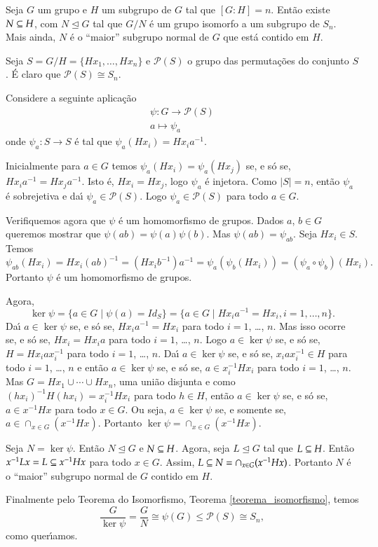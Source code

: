 \begin{teorema}\label{teorema_da_representacao}
	Seja $G$ um grupo e $H$ um subgrupo de $G$ tal que $[G : H] = n$. Ent\~ao existe $N \subseteq H$, com $N \unlhd G$ tal que $G/N$ \'e um grupo isomorfo a um subgrupo de $S_n$. Mais ainda, $N$ \'e o ``maior'' subgrupo normal de $G$ que est\'a contido em $H$.
\end{teorema}
\begin{prova}
	Seja $S = G/H = \{Hx_1, \dots, Hx_n\}$ e $\mathcal{P}(S)$ o grupo das permuta\c{c}\~oes do conjunto $S$. \'E claro que $\mathcal{P}(S) \cong S_n$.

	Considere a seguinte aplica\c{c}\~ao
	\begin{align*}
		\psi : G \to \mathcal{P}(S)\\
		a \mapsto \psi_a
	\end{align*}
	onde $\psi_a : S \to S$ \'e tal que $\psi_a(Hx_i) = Hx_ia^{-1}$.

	Inicialmente para $a \in G$ temos $\psi_a(Hx_i) = \psi_a(Hx_j)$ se, e s\'o se, $Hx_ia^{-1} = Hx_ja^{-1}$. Isto \'e, $Hx_i = Hx_j$, logo $\psi_a$ \'e injetora. Como $|S| = n$, ent\~ao $\psi_a$ \'e sobrejetiva e da{\'\i} $\psi_a \in \mathcal{P}(S)$. Logo $\psi_a \in \mathcal{P}(S)$ para todo $a \in G$.

	Verifiquemos agora que $\psi$ \'e um homomorfismo de grupos. Dados $a$, $b \in G$ queremos mostrar que $\psi(ab) = \psi(a)\psi(b)$. Mas $\psi(ab) = \psi_{ab}$. Seja $Hx_i \in S$. Temos
	\[
		\psi_{ab}(Hx_i) = Hx_i(ab)^{-1} = (Hx_ib^{-1})a^{-1} = \psi_a(\psi_b(Hx_i)) = (\psi_a\circ\psi_b)(Hx_i).
	\]
	Portanto $\psi$ \'e um homomorfismo de grupos.

	Agora,
	\[
		\ker\psi = \{a \in G \mid \psi(a) = Id_S\} = \{a \in G \mid Hx_ia^{-1} = Hx_i, i = 1, \dots, n\}.
	\]
	Da{\'\i} $a \in \ker\psi$ se, e s\'o se, $Hx_ia^{-1} = Hx_i$ para todo $i = 1$, \dots, $n$. Mas isso ocorre se, e s\'o se, $Hx_i = Hx_ia$ para todo $i = 1$, \dots, $n$. Logo $a \in \ker\psi$ se, e s\'o se, $H = Hx_iax_i^{-1}$ para todo $i = 1$, \dots, $n$. Da{\'\i} $a \in \ker\psi$ se, e s\'o se, $x_iax_i^{-1} \in H$ para todo $i = 1$, \dots, $n$ e ent\~ao $a \in \ker\psi$ se, e s\'o se, $a \in x_i^{-1}Hx_i$ para todo $i = 1$, \dots, $n$. Mas $G = Hx_1 \cup \cdots \cup Hx_n$, uma uni\~ao disjunta e como $(hx_i)^{-1}H(hx_i) = x_i^{-1}Hx_i$ para todo $h \in H$, ent\~ao $a \in \ker\psi$ se, e s\'o se, $a \in x^{-1}Hx$ para todo $x \in G$. Ou seja, $a \in \ker\psi$ se, e somente se, $a \in \cap_{x \in G}(x^{-1}Hx)$. Portanto $\ker\psi = \cap_{x \in G}(x^{-1}Hx)$.

	Seja $N = \ker\psi$. Ent\~ao $N \unlhd G$ e $N \subseteq H$. Agora, seja $L \unlhd G$ tal que $L \subseteq H$. Ent\~ao $x^{-1}Lx = L \subseteq x^{-1}Hx$ para todo $x \in G$. Assim, $L \subseteq N = \cap_{x \in G}(x^{-1}Hx)$. Portanto $N$ \'e o ``maior'' subgrupo normal de $G$ contido em $H$.

	Finalmente pelo Teorema do Isomorfismo, Teorema \ref{teorema_isomorfismo}, temos
	\[
		\dfrac{G}{\ker\psi} = \dfrac{G}{N} \cong \psi(G) \le \mathcal{P}(S) \cong S_n,
	\]
	como quer{\'\i}amos.
\end{prova}

